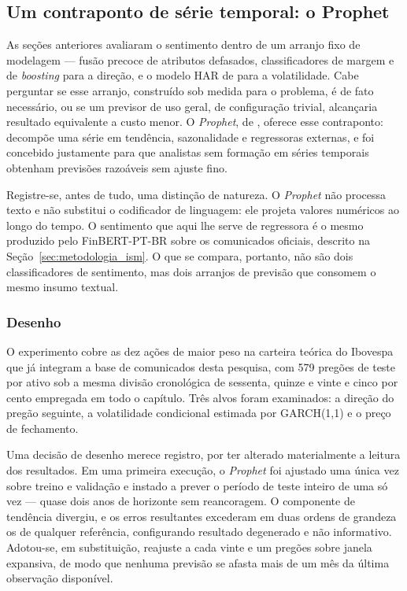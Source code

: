 \subsection{Um contraponto de série temporal: o Prophet}
\label{sec:prophet}

As seções anteriores avaliaram o sentimento dentro de um arranjo fixo de modelagem --- fusão
precoce de atributos defasados, classificadores de margem e de \textit{boosting} para a direção,
e o modelo HAR de  para a volatilidade. Cabe perguntar se esse
arranjo, construído sob medida para o problema, é de fato necessário, ou se um previsor de uso
geral, de configuração trivial, alcançaria resultado equivalente a custo menor. O
\textit{Prophet}, de , oferece esse contraponto: decompõe uma
série em tendência, sazonalidade e regressoras externas, e foi concebido justamente para que
analistas sem formação em séries temporais obtenham previsões razoáveis sem ajuste fino.

Registre-se, antes de tudo, uma distinção de natureza. O \textit{Prophet} não processa texto e não
substitui o codificador de linguagem: ele projeta valores numéricos ao longo do tempo. O sentimento
que aqui lhe serve de regressora é o mesmo produzido pelo FinBERT-PT-BR sobre os comunicados
oficiais, descrito na Seção~\ref{sec:metodologia_ism}. O que se compara, portanto, não são dois
classificadores de sentimento, mas dois arranjos de previsão que consomem o mesmo insumo textual.

\subsubsection{Desenho}

O experimento cobre as dez ações de maior peso na carteira teórica do Ibovespa que já integram a
base de comunicados desta pesquisa, com 579 pregões de teste por ativo sob a
mesma divisão cronológica de sessenta, quinze e vinte e cinco por cento empregada em todo o
capítulo. Três alvos foram examinados: a direção do pregão seguinte, a volatilidade condicional
estimada por GARCH(1,1) e o preço de fechamento.

Uma decisão de desenho merece registro, por ter alterado materialmente a leitura dos resultados. Em
uma primeira execução, o \textit{Prophet} foi ajustado uma única vez sobre treino e validação e
instado a prever o período de teste inteiro de uma só vez --- quase dois anos de horizonte sem
reancoragem. O componente de tendência divergiu, e os erros resultantes excederam em duas ordens de
grandeza os de qualquer referência, configurando resultado degenerado e não informativo. Adotou-se,
em substituição, reajuste a cada vinte e um pregões sobre janela expansiva, de modo que nenhuma
previsão se afasta mais de um mês da última observação disponível.

